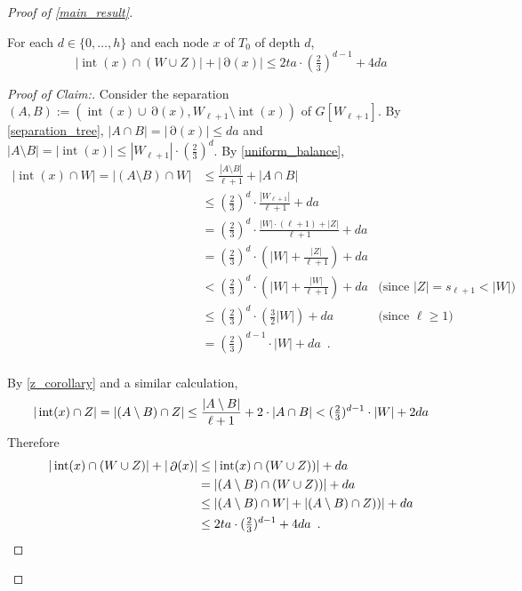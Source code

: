 \documentclass{patmorin}
\newenvironment{clmproof}{\begin{proof}[Proof of Claim:]\renewcommand{\qedsymbol}{\rule{1ex}{1ex}}}{\end{proof}}
\DeclareMathOperator{\interior}{int}
\DeclareMathOperator{\boundary}{\partial}
\begin{document}
\begin{proof}[Proof of \cref{main_result}]
   \begin{clm} \label{cell_bound}
     For each $d\in\{0,\ldots,h\}$ and each node $x$ of $T_0$ of depth $d$,
     \begin{equation}
       |\interior(x)\cap (W\cup Z)|+|\boundary(x)| \le 2ta\cdot (\tfrac{2}{3})^{d-1}+4da \label{t_bound}
     \end{equation}
   \end{clm}


  \begin{clmproof}
  Consider the separation $(A,B):=(\interior(x)\cup\boundary(x),W_{\ell+1}\setminus\interior(x))$ of $G[W_{\ell+1}]$. By \cref{separation_tree}, $|A\cap B|=|\boundary(x)|\le da$ and $|A\setminus B|=|\interior(x)|\le |W_{\ell+1}|\cdot (\tfrac{2}{3})^{d}$.  By \cref{uniform_balance},
  \begin{align*}
    |\interior(x)\cap W| = |(A\setminus B)\cap W| & \le \frac{|A\setminus B|}{\ell+1} +  |A\cap B| \\
    & \le (\tfrac{2}{3})^d\cdot \frac{|W_{\ell+1}|}{\ell+1} + da \\
    & = (\tfrac{2}{3})^d\cdot \frac{|W|\cdot (\ell+1)+|Z|}{\ell+1} + da \\
    & = (\tfrac{2}{3})^d\cdot \left(|W|+\frac{|Z|}{\ell+1}\right) +  da \\
    & < (\tfrac{2}{3})^d\cdot \left(|W|+\frac{|W|}{\ell+1}\right) +  da
      & \text{(since $|Z|=s_{\ell+1}<|W|$)} \\
    & \le (\tfrac{2}{3})^d\cdot \left(\tfrac{3}{2}|W|\right) +  da
      & \text{(since $\ell\ge 1$)} \\
    & = (\tfrac{2}{3})^{d-1}\cdot|W| + da \enspace . \\
  \end{align*}

  By \cref{z_corollary} and a similar calculation,
  \[
    |\interior(x)\cap Z|
      = |(A\setminus B)\cap Z|
      \le \frac{|A\setminus B|}{\ell+1} + 2\cdot |A\cap B|
      <  (\tfrac{2}{3})^{d-1}\cdot|W| + 2da \\
  \]
  Therefore
  \begin{align*}
    |\interior(x)\cap (W\cup Z)| + |\boundary(x)|
      & \le |\interior(x)\cap (W\cup Z))| + da\\
      & = |(A\setminus B)\cap (W\cup Z))| + da \\
      & \le |(A\setminus B)\cap W| + |(A\setminus B)\cap Z))| + da \\
      & \le 2ta\cdot(\tfrac{2}{3})^{d-1} + 4da \enspace . \qedhere
  \end{align*}
  \end{clmproof}


\end{proof}
\end{document}
